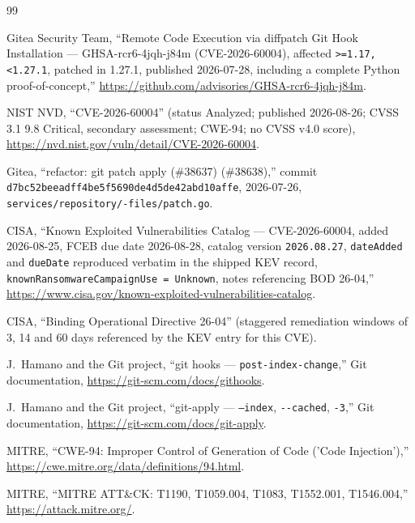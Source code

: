 \documentclass[journal]{IEEEtran}
\begin{document}
\begin{thebibliography}{99}

Gitea Security Team, ``Remote Code Execution via diffpatch Git Hook
Installation --- GHSA-rcr6-4jqh-j84m (CVE-2026-60004), affected
\texttt{>=1.17, <1.27.1}, patched in 1.27.1, published 2026-07-28, including
a complete Python proof-of-concept,''
\url{https://github.com/advisories/GHSA-rcr6-4jqh-j84m}.

NIST NVD, ``CVE-2026-60004'' (status Analyzed; published 2026-08-26;
CVSS 3.1 9.8 Critical, secondary assessment; CWE-94; no CVSS v4.0 score),
\url{https://nvd.nist.gov/vuln/detail/CVE-2026-60004}.

Gitea, ``refactor: git patch apply (\#38637) (\#38638),'' commit
\texttt{d7bc52be\hspace{0pt}eadff4be5f56\hspace{0pt}90de4d5de4\hspace{0pt}2abd10affe},
2026-07-26, \texttt{services/repository/-files/patch.go}.

CISA, ``Known Exploited Vulnerabilities Catalog --- CVE-2026-60004, added
2026-08-25, FCEB due date 2026-08-28, catalog version \texttt{2026.08.27},
\texttt{dateAdded} and \texttt{dueDate} reproduced verbatim in the shipped
KEV record, \texttt{knownRansomwareCampaignUse =
Unknown}, notes referencing BOD 26-04,''
\url{https://www.cisa.gov/known-exploited-vulnerabilities-catalog}.

CISA, ``Binding Operational Directive 26-04'' (staggered remediation windows
of 3, 14 and 60 days referenced by the KEV entry for this CVE).

J.~Hamano and the Git project, ``git hooks --- \texttt{post-index-change},''
Git documentation, \url{https://git-scm.com/docs/githooks}.

J.~Hamano and the Git project, ``git-apply --- \texttt{--index},
\texttt{-\/-cached}, \texttt{-3},'' Git documentation,
\url{https://git-scm.com/docs/git-apply}.

MITRE, ``CWE-94: Improper Control of Generation of Code ('Code
Injection'),'' \url{https://cwe.mitre.org/data/definitions/94.html}.

MITRE, ``MITRE ATT\&CK: T1190, T1059.004, T1083, T1552.001, T1546.004,''
\url{https://attack.mitre.org/}.

\end{thebibliography}
\end{document}
